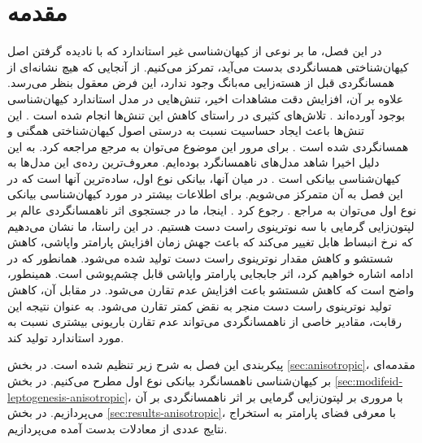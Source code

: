 \documentclass[a4paper]{book}
\begin{document}
\section{مقدمه}
در این فصل، ما بر نوعی از کیهان‌شناسی غیر استاندارد که با نادیده گرفتن اصل کیهان‌شناختی همسانگردی بدست می‌آید، تمرکز می‌کنیم. از آنجایی که هیچ نشانه‌ای از همسانگردی قبل از هسته‌زایی مه‌بانگ وجود ندارد، این فرض معقول بنظر می‌رسد. علاوه بر آن، افزایش دقت مشاهدات اخیر، تنش‌هایی در مدل استاندارد کیهان‌شناسی بوجود آورده‌اند \cite{Verde:2019ivm,DiValentino:2020zio,DiValentino:2021izs}. تلاش‌های کثیری در راستای کاهش این تنش‌ها انجام شده است \cite{Abdalla:2022yfr,Perivolaropoulos:2021jda}. این تنش‌ها باعث ایجاد حساسیت نسبت به درستی اصول کیهان‌شناختی همگنی و همسانگردی شده است \cite{Colgain:2022tql,Colgain:2022rxy,Krishnan:2021dyb,Krishnan:2021jmh,PhysRevD.100.023532}. برای مرور این موضوع می‌توان به مرجع \cite{Aluri:2022hzs} مراجعه کرد. به این دلیل اخیرا شاهد مدل‌های ناهمسانگرد بوده‌ایم. معروف‌ترین رده‌ی این مدل‌ها به کیهان‌شناسی بیانکی است \cite{Ellis:1968vb}. در میان آنها، بیانکی نوع اول، ساده‌ترین آنها است که در این فصل به آن متمرکز می‌شویم. برای اطلاعات بیشتر در مورد کیهان‌شناسی بیانکی نوع اول می‌توان به مراجع . رجوع کرد \cite{delliou_anisotropic_2020,Russell:2013oda,jacobs1969bianchi}. اینجا، ما در جستجوی اثر ناهمسانگردی عالم بر لپتون‌زایی گرمایی با سه نوترینوی راست دست هستیم. در این راستا، ما نشان می‌دهیم که نرخ انبساط هابل تغییر می‌کند که باعث جهش زمان افزایش پارامتر واپاشی، کاهش شستشو و کاهش مقدار نوترینوی راست دست تولید شده می‌شود. همانطور که در ادامه اشاره خواهیم کرد، اثر جابجایی پارامتر واپاشی قابل چشم‌پوشی است. همینطور، واضح است که کاهش شستشو باعت افزایش عدم تقارن می‌شود. در مقابل آن، کاهش تولید نوترینوی راست دست منجر به نقض کمتر تقارن  می‌شود. به عنوان نتیجه این رقابت، مقادیر خاصی از ناهمسانگردی می‌تواند عدم تقارن باریونی بیشتری نسبت به مورد استاندارد تولید کند.

پیکربندی این فصل به شرح زیر تنظیم شده است. در بخش \ref{sec:anisotropic}، مقدمه‌ای بر کیهان‌شناسی ناهمسانگرد بیانکی نوع اول مطرح می‌کنیم. در بخش \ref{sec:modifeid-leptogenesis-anisotropic}، با مروری بر لپتون‌زایی گرمایی بر اثر ناهمسانگردی بر آن می‌پردازیم. در بخش \ref{sec:results-anisotropic}، با معرفی فضای پارامتر به استخراج نتایج عددی از معادلات بدست آمده می‌پردازیم.
\end{document}

